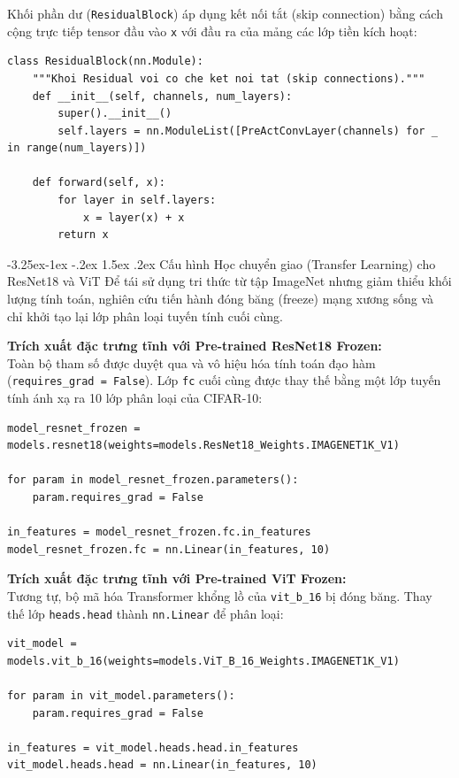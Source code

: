 \documentclass[a4paper]{article}
\makeatletter
\theoremstyle{definition}
\newcounter {subsubsubsection}[subsubsection]
\newcommand\subsubsubsection{\@startsection{subsubsubsection}{4}{\z@}%
                                     {-3.25ex\@plus -1ex \@minus -.2ex}%
                                     {1.5ex \@plus .2ex}%
                                     {\normalfont\normalsize\bfseries}}
\makeatother
\begin{document}
Khối phần dư (\texttt{ResidualBlock}) áp dụng kết nối tắt (skip connection) bằng cách cộng trực tiếp tensor đầu vào \texttt{x} với đầu ra của mảng các lớp tiền kích hoạt:
\begin{verbatim}
class ResidualBlock(nn.Module):
    """Khoi Residual voi co che ket noi tat (skip connections)."""
    def __init__(self, channels, num_layers):
        super().__init__()
        self.layers = nn.ModuleList([PreActConvLayer(channels) for _ in range(num_layers)])

    def forward(self, x):
        for layer in self.layers:
            x = layer(x) + x
        return x
\end{verbatim}

\subsubsubsection{Cấu hình Học chuyển giao (Transfer Learning) cho ResNet18 và ViT}
Để tái sử dụng tri thức từ tập ImageNet nhưng giảm thiểu khối lượng tính toán, nghiên cứu tiến hành đóng băng (freeze) mạng xương sống và chỉ khởi tạo lại lớp phân loại tuyến tính cuối cùng.

\textbf{Trích xuất đặc trưng tĩnh với Pre-trained ResNet18 Frozen:}\\
Toàn bộ tham số được duyệt qua và vô hiệu hóa tính toán đạo hàm (\texttt{requires\_grad = False}). Lớp \texttt{fc} cuối cùng được thay thế bằng một lớp tuyến tính ánh xạ ra 10 lớp phân loại của CIFAR-10:
\begin{verbatim}
model_resnet_frozen = models.resnet18(weights=models.ResNet18_Weights.IMAGENET1K_V1)

for param in model_resnet_frozen.parameters():
    param.requires_grad = False

in_features = model_resnet_frozen.fc.in_features
model_resnet_frozen.fc = nn.Linear(in_features, 10)
\end{verbatim}

\textbf{Trích xuất đặc trưng tĩnh với Pre-trained ViT Frozen:}\\
Tương tự, bộ mã hóa Transformer khổng lồ của \texttt{vit\_b\_16} bị đóng băng. Thay thế lớp \texttt{heads.head} thành \texttt{nn.Linear} để phân loại:
\begin{verbatim}
vit_model = models.vit_b_16(weights=models.ViT_B_16_Weights.IMAGENET1K_V1)

for param in vit_model.parameters():
    param.requires_grad = False

in_features = vit_model.heads.head.in_features
vit_model.heads.head = nn.Linear(in_features, 10)
\end{verbatim}
\end{document}
